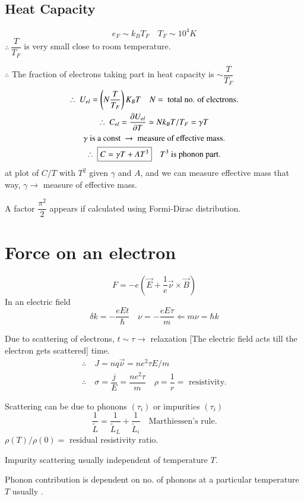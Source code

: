 \subsection*{Heat Capacity}
$$
e_{F}\sim k_{B}T_{F}\quad T_{F}\sim 10^{4}K
$$
$\therefore \ \dfrac{T}{T_{F}}$ is very small close to room temperature.

$\therefore$ The fraction of electrons taking part in heat capacity is $\sim \dfrac{T}{T_{F}}$
\begin{gather*}
\therefore \ U_{el}=\left(N\dfrac{T}{T_{F}}\right)K_{B}T\quad N= \text{ total no. of electrons.}\\
\therefore \ C_{el}=\dfrac{\partial U_{el}}{\partial T}\simeq N k_{B}T/T_{F}=\gamma T\\
\gamma \text{ is a const } \to \text{ measure of effective mass.}\\
\therefore \ \fbox{$C=\gamma T+AT^{3}$}\quad T^{3} \text{ is phonon part.}
\end{gather*}
at plot of $C/T$ with $T^{2}$ given $\gamma$ and $A$, and we can measure effective mass that way, $\gamma\to$ measure of effective mass.

A factor $\dfrac{\pi^{2}}{2}$ appears if calculated using Formi-Dirac distribution.

\section*{Force on an electron}
$$
F=-e(\overrightarrow{E}+\dfrac{1}{e}\overrightarrow{\nu}\times \overrightarrow{B})
$$
In an electric field
$$
\delta k=-\dfrac{eEt}{\hbar}\quad \nu=-\dfrac{eE\tau}{m}\Leftarrow m\nu=\hbar k
$$

Due to scattering of electrons, $t\sim \tau\to$ relaxation [The electric field acts till the electron gets scattered] time.
\begin{gather*}
\therefore\quad J=nq\overrightarrow{\nu}=ne^{2}\tau E/m\\
\therefore\quad \sigma =\dfrac{j}{E}=\dfrac{ne^{2}\tau}{m}\quad \rho=\dfrac{1}{r}=\text{ resistivity.}
\end{gather*}

Scattering can be due to phonons $(\tau_{i})$ or impurities $(\tau_{i})$
$$
\dfrac{1}{\widetilde{L}}=\dfrac{1}{\widetilde{L}_{L}}+\dfrac{1}{\widetilde{L}_{i}}\quad \text{Marthiessen's rule.}
$$
$\rho(T)/\rho(0)=$ residual resistivity ratio.

Impurity scattering usually independent of temperature $T$.

Phonon contribution is dependent on no. of phonons at a particular temperature $T$ usually .

